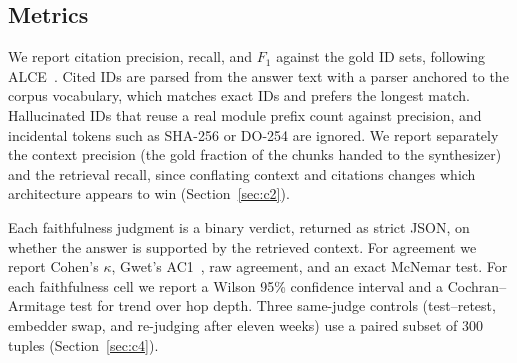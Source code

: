 \subsection{Metrics}
\label{sec:metrics}
We report citation precision, recall, and $F_1$ against the gold ID
sets, following ALCE~\cite{alce2023}. Cited IDs are parsed from the
answer text with a parser anchored to the corpus vocabulary, which
matches exact IDs and prefers the longest match. Hallucinated IDs that
reuse a real module prefix count against precision, and incidental
tokens such as SHA-256 or DO-254 are ignored. We report separately the context precision (the gold fraction of the
chunks handed to the synthesizer) and the retrieval recall, since
conflating context and citations changes which architecture appears to
win (Section~\ref{sec:c2}).

Each faithfulness judgment is a binary verdict, returned as strict JSON,
on whether the answer is supported by the retrieved context. For
agreement we report Cohen's $\kappa$, Gwet's
AC1~\cite{gwet2008,feinstein1990}, raw agreement, and an exact McNemar
test. For each faithfulness cell we report a Wilson 95\% confidence
interval and a Cochran--Armitage test for trend over hop depth. Three
same-judge controls (test--retest, embedder swap, and re-judging after
eleven weeks) use a paired subset of 300 tuples
(Section~\ref{sec:c4}).
